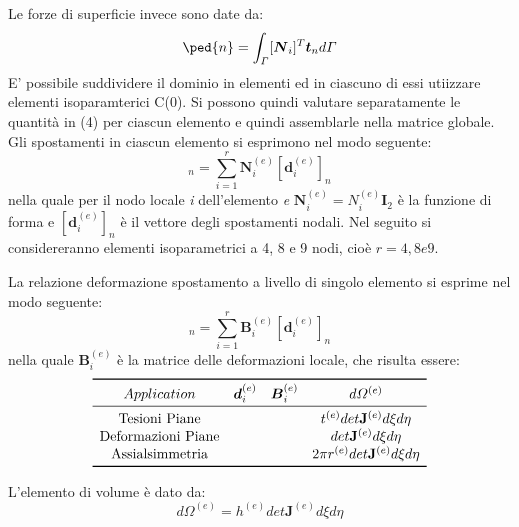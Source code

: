 Le forze di superficie invece sono date da:
\begin{equation}
	[\boldsymbol{f}\ped{Ti}]\ped{n} = \int_\varGamma[\boldsymbol{N}_i]^T \boldsymbol{t}_n d\varGamma
\end{equation}
E' possibile suddividere il dominio in elementi ed in ciascuno di essi utiizzare elementi isoparamterici C(0). Si possono quindi valutare separatamente le quantità in (4) per ciascun elemento e quindi assemblarle nella matrice globale. Gli spostamenti in ciascun elemento si esprimono nel modo seguente:
\begin{equation}
	[u^{(e)}]_n= \sum_{i=1}^{r}\boldsymbol{N}_i^{(e)}[\boldsymbol{d}_i^{(e)}]_n
\end{equation}
nella quale per il nodo locale \textit{i} dell'elemento \textit{e} $\boldsymbol{N}_i^{(e)}=N_i^{(e)}\boldsymbol{I}_2$ è la funzione di forma e $[\boldsymbol{d}_i^{(e)}]_n$ è il vettore degli spostamenti nodali. Nel seguito si considereranno elementi isoparametrici a 4, 8 e 9 nodi, cioè $\textit{r}=4,8 e 9$.

La relazione deformazione spostamento a livello di singolo elemento si esprime nel modo seguente:
\begin{equation}
	[\boldsymbol{\epsilon}^{(e)}]_n = \sum_{i=1}^r \boldsymbol{B}_i^{(e)}[\boldsymbol{d}_i^{(e)}]_n
\end{equation}
nella quale $\boldsymbol{B}_i^{(e)}$ è la matrice delle deformazioni locale, che risulta essere:
\[
\begin{array}{cccc}
	\toprule
	Application               & \boldsymbol{d}_i^{(e)}     & \boldsymbol{B}_i^{(e)}     & d\varOmega^{(e)}                             \\
	\midrule
	\text{Tesioni Piane}      &   &   & t^{(e)} det \mathbf{J}^{(e)} d\xi d\eta      \\
	\text{Deformazioni Piane} &   &   & det \mathbf{J}^{(e)} d\xi d\eta              \\
	\text{Assialsimmetria}    &   &   & 2\pi r^{(e)} det \mathbf{J}^{(e)} d\xi d\eta \\
	\bottomrule
\end{array}
\]

L'elemento di volume è dato da:
\begin{equation}
	d \Omega^{(e)} = h^{(e)} det \mathbf{J}^{(e)} d \xi d \eta
\end{equation}


